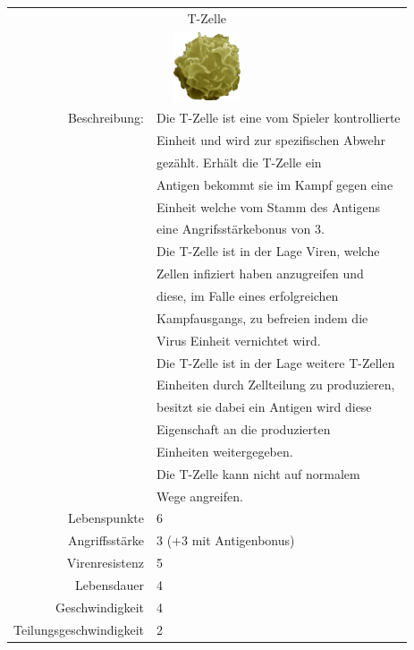 \documentclass[11pt]{article}
\begin{document}
\begin{tabular}{|r|l|}
\hline
\multicolumn{2}{c}{T-Zelle}\\
\multicolumn{2}{c}{\includegraphics[width=2.0cm]{tcellorig.png}}\\\hline\hline
Beschreibung:	& Die T-Zelle ist eine vom Spieler kontrollierte\\
			& Einheit und wird zur spezifischen Abwehr\\
			& gez\"ahlt. Erh\"alt die T-Zelle ein\\
			& Antigen bekommt sie im Kampf gegen eine\\
			& Einheit welche vom Stamm des Antigens\\
			& eine Angrifsst\"arkebonus von 3.\\
			& Die T-Zelle ist in der Lage Viren, welche\\
			& Zellen infiziert haben anzugreifen und\\
			& diese, im Falle eines erfolgreichen\\
			& Kampfausgangs, zu befreien indem die\\
			& Virus Einheit vernichtet wird.\\
			& Die T-Zelle ist in der Lage weitere T-Zellen\\
			& Einheiten durch Zellteilung zu produzieren,\\
			& besitzt sie dabei ein  Antigen wird diese\\
			& Eigenschaft an die produzierten\\
			& Einheiten weitergegeben.\\
			& Die T-Zelle kann nicht auf normalem\\
			& Wege angreifen.\\\hline
Lebenspunkte	& 6\\\hline
Angriffsst\"arke	& 3 (+3 mit Antigenbonus)\\\hline
Virenresistenz	& 5\\\hline
Lebensdauer		& 4\\\hline
Geschwindigkeit	& 4\\\hline
Teilungsgeschwindigkeit	& 2\\\hline
\end{tabular}
\end{document}
